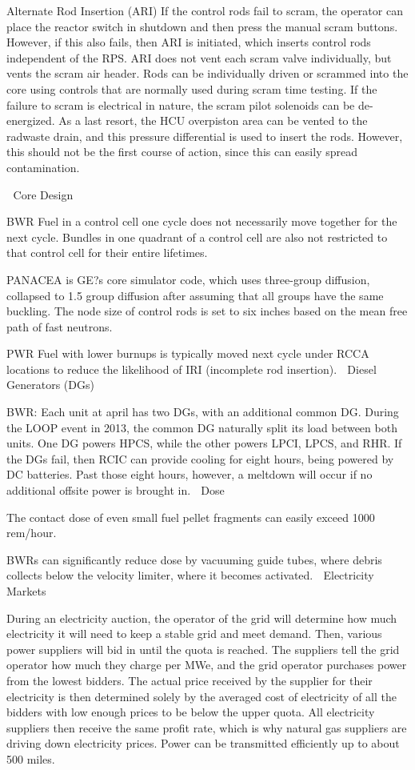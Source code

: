 \documentclass[10pt]{article}
\begin{document}
Alternate Rod Insertion (ARI)
If the control rods fail to scram, the operator can place the reactor switch in shutdown and then press the manual scram buttons. However, if this also fails, then ARI is initiated, which inserts control rods independent of the RPS. ARI does not vent each scram valve individually, but vents the scram air header. Rods can be individually driven or scrammed into the core using controls that are normally used during scram time testing. If the failure to scram is electrical in nature, the scram pilot solenoids can be de-energized. As a last resort, the HCU overpiston area can be vented to the radwaste drain, and this pressure differential is used to insert the rods. However, this should not be the first course of action, since this can easily spread contamination. 


Core Design

BWR
Fuel in a control cell one cycle does not necessarily move together for the next cycle. Bundles in one quadrant of a control cell are also not restricted to that control cell for their entire lifetimes. 

PANACEA is GE?s core simulator code, which uses three-group diffusion, collapsed to 1.5 group diffusion after assuming that all groups have the same buckling. The node size of control rods  is set to six inches based on the mean free path of fast neutrons. 

PWR
Fuel with lower burnups is typically moved next cycle under RCCA locations to reduce the likelihood of IRI (incomplete rod insertion). 
Diesel Generators (DGs)


BWR: Each unit at april has two DGs, with an additional common DG. During the LOOP event in 2013, the common DG naturally split its load between both units. One DG powers HPCS, while the other powers LPCI, LPCS, and RHR. If the DGs fail, then RCIC can provide cooling for eight hours, being powered by DC batteries. Past those eight hours, however, a meltdown will occur if no additional offsite power is brought in. 

Dose

The contact dose of even small fuel pellet fragments can easily exceed 1000 rem/hour. 

BWRs can significantly reduce dose by vacuuming guide tubes, where debris collects below the velocity limiter, where it becomes activated. 
Electricity Markets

During an electricity auction, the operator of the grid will determine how much electricity it will need to keep a stable grid and meet demand. Then, various power suppliers will bid in until the quota is reached. The suppliers tell the grid operator how much they charge per MWe, and the grid operator purchases power from the lowest bidders. The actual price received by the supplier for their electricity is then determined solely by the averaged cost of electricity of all the bidders with low enough prices to be below the upper quota. All electricity suppliers then receive the same profit rate, which is why natural gas suppliers are driving down electricity prices. Power can be transmitted efficiently up to about 500 miles. 
\end{document}
